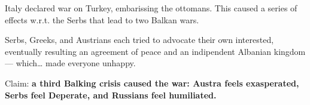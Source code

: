 \documentclass[letterpaper]{article}
\begin{document}
Italy declared war on Turkey, embarissing the ottomans. This caused a
series of effects w.r.t. the Serbs that lead to two Balkan wars.

Serbs, Greeks, and Austrians each tried to advocate their own
interested, eventually resulting an agreement of peace and an
indipendent Albanian kingdom --- which\ldots{} made everyone unhappy.

Claim: \textbf{a third Balking crisis caused the war: Austra feels exasperated,
Serbs feel Deperate, and Russians feel humiliated.}
\end{document}
